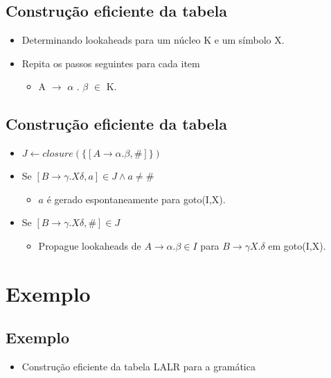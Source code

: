 \documentclass[11pt]{article}
\begin{document}
\subsection*{Construção eficiente da tabela}
\label{sec:orga20ce9e}

\begin{itemize}
\item Determinando lookaheads para um núcleo K e um símbolo X.

\item Repita os passos seguintes para cada item
\begin{itemize}
\item A \(\to\) \(\alpha\) . \(\beta\) \(\in\) K.
\end{itemize}
\end{itemize}
\subsection*{Construção eficiente da tabela}
\label{sec:orga06ae93}

\begin{itemize}
\item \(J \leftarrow closure(\{[A\to \alpha . \beta, \#]\})\)
\item Se \([B \to \gamma .X \delta, a] \in J \land a \neq \#\)
\begin{itemize}
\item \(a\) é gerado espontaneamente para goto(I,X).
\end{itemize}
\item Se \([B \to \gamma .X \delta, \#] \in J\)
\begin{itemize}
\item Propague lookaheads de \(A\to \alpha . \beta \in I\) para \(B \to \gamma X.\delta\) em goto(I,X).
\end{itemize}
\end{itemize}
\section*{Exemplo}
\label{sec:org9b7be65}

\subsection*{Exemplo}
\label{sec:org7a40bdb}

\begin{itemize}
\item Construção eficiente da tabela LALR para a gramática
\end{itemize}
\end{document}
